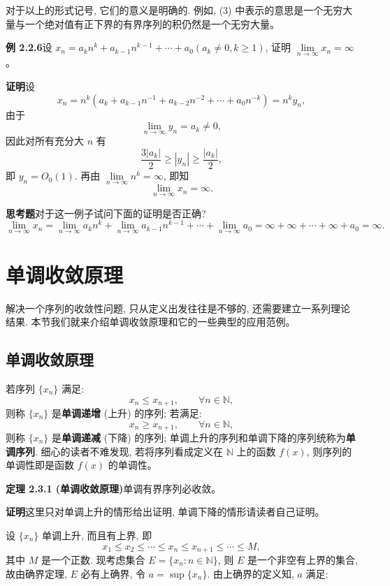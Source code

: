 \documentclass[UTF8, 12pt, fontset=fandol, oneside]{ctexart}
\begin{document}
对于以上的形式记号, 它们的意义是明确的. 例如, (3) 中表示的意思是一个无穷大量与一个绝对值有正下界的有界序列的积仍然是一个无穷大量。

\noindent\textbf{例 2.2.6}\quad 设 $x_n=a_kn^k+a_{k-1}n^{k-1}+\cdots+a_0(a_k\ne0,k\geqslant1)$, 证明 $\lim\limits_{n\to\infty}x_n=\infty$。

\noindent\textbf{证明}\quad 设
\[
  x_n=n^k(a_k+a_{k-1}n^{-1}+a_{k-2}n^{-2}+\cdots+a_0n^{-k})=n^ky_n,
\]
由于
\[
  \lim_{n\to\infty}y_n=a_k\ne0,
\]
因此对所有充分大 $n$ 有
\[
  \frac{3|a_k|}{2}\geqslant |y_n|\geqslant\frac{|a_k|}{2},
\]
即 $y_n=O_0(1)$. 再由 $\lim\limits_{n\to\infty}n^k=\infty$, 即知
\[
  \lim_{n\to\infty}x_n=\infty.
\]

\noindent\textbf{思考题}\quad 对于这一例子试问下面的证明是否正确?
\[
  \lim_{n\to\infty}x_n
  =
  \lim_{n\to\infty}a_kn^k+\lim_{n\to\infty}a_{k-1}n^{k-1}+\cdots+\lim_{n\to\infty}a_0
  =
  \infty+\infty+\cdots+\infty+a_0=\infty.
\]

\section{单调收敛原理}

解决一个序列的收敛性问题, 只从定义出发往往是不够的, 还需要建立一系列理论结果. 本节我们就来介绍单调收敛原理和它的一些典型的应用范例。

\subsection{单调收敛原理}

若序列 $\{x_n\}$ 满足:
\[
  x_n\leqslant x_{n+1},\qquad \forall n\in\mathbb{N},
\]
则称 $\{x_n\}$ 是\textbf{单调递增} (上升) 的序列; 若满足:
\[
  x_n\geqslant x_{n+1},\qquad \forall n\in\mathbb{N},
\]
则称 $\{x_n\}$ 是\textbf{单调递减} (下降) 的序列; 单调上升的序列和单调下降的序列统称为\textbf{单调序列}. 细心的读者不难发现, 若将序列看成定义在 $\mathbb{N}$ 上的函数 $f(x)$, 则序列的单调性即是函数 $f(x)$ 的单调性。

\noindent\textbf{定理 2.3.1 (单调收敛原理)}\quad 单调有界序列必收敛。

\noindent\textbf{证明}\quad 这里只对单调上升的情形给出证明, 单调下降的情形请读者自己证明。

设 $\{x_n\}$ 单调上升, 而且有上界, 即
\[
  x_1\leqslant x_2\leqslant\cdots\leqslant x_n\leqslant x_{n+1}\leqslant\cdots\leqslant M,
\]
其中 $M$ 是一个正数. 现考虑集合 $E=\{x_n:n\in\mathbb{N}\}$, 则 $E$ 是一个非空有上界的集合, 故由确界定理, $E$ 必有上确界, 令 $a=\sup\{x_n\}$. 由上确界的定义知, $a$ 满足:
\end{document}
